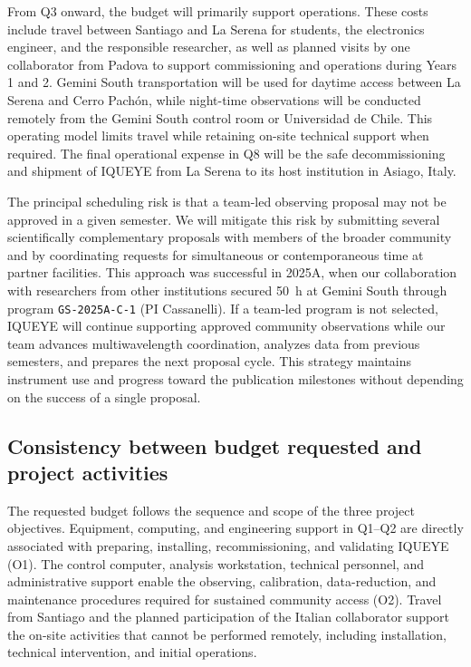 \documentclass[
    11pt,
    a4paper,
    ]{article}
\begin{document}
From Q3 onward, the budget will primarily support operations. These costs include travel between Santiago and La Serena for students, the electronics engineer, and the responsible researcher, as well as planned visits by one collaborator from Padova to support commissioning and operations during Years 1 and 2. Gemini South transportation will be used for daytime access between La Serena and Cerro Pachón, while night-time observations will be conducted remotely from the Gemini South control room or Universidad de Chile. This operating model limits travel while retaining on-site technical support when required. The final operational expense in Q8 will be the safe decommissioning and shipment of IQUEYE from La Serena to its host institution in Asiago, Italy.

The principal scheduling risk is that a team-led observing proposal may not be approved in a given semester. We will mitigate this risk by submitting several scientifically complementary proposals with members of the broader community and by coordinating requests for simultaneous or contemporaneous time at partner facilities. This approach was successful in 2025A, when our collaboration with researchers from other institutions secured \qty{50}{\hour} at Gemini South through program \texttt{GS-2025A-C-1} (PI Cassanelli). If a team-led program is not selected, IQUEYE will continue supporting approved community observations while our team advances multiwavelength coordination, analyzes data from previous semesters, and prepares the next proposal cycle. This strategy maintains instrument use and progress toward the publication milestones without depending on the success of a single proposal.

\subsection{Consistency between budget requested and project activities}

The requested budget follows the sequence and scope of the three project objectives. Equipment, computing, and engineering support in Q1--Q2 are directly associated with preparing, installing, recommissioning, and validating IQUEYE (O1). The control computer, analysis workstation, technical personnel, and administrative support enable the observing, calibration, data-reduction, and maintenance procedures required for sustained community access (O2). Travel from Santiago and the planned participation of the Italian collaborator support the on-site activities that cannot be performed remotely, including installation, technical intervention, and initial operations.
\end{document}
